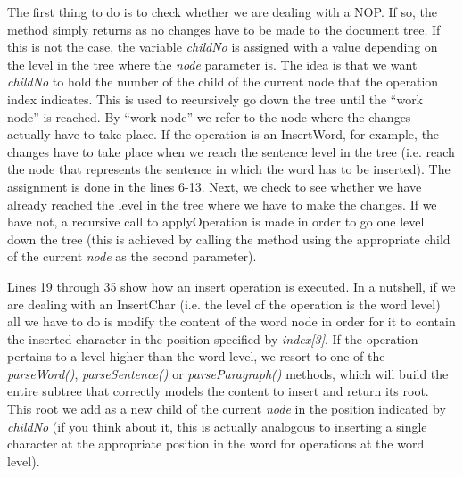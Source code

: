 The first thing to do is to check whether we are dealing with a NOP. If so, the method simply
returns as no changes have to be made to the document tree. If this is not the case, the
variable \emph{childNo} is assigned with a value depending on the level in the tree where the
\emph{node} parameter is. The idea is that we want \emph{childNo} to hold the number
of the child of the current node that the operation index indicates. This is used to
recursively go down the tree until the ``work node'' is reached. By ``work node'' we
refer to the node where the changes actually have to take place. If the operation is
an InsertWord, for example, the changes have to take place when we reach the sentence
level in the tree (i.e. reach the node that represents the sentence in which the word
has to be inserted). The assignment is done in the lines 6-13. Next, we check to see
whether we have already reached the level in the tree where we have to make the changes.
If we have not, a recursive call to applyOperation is made in order to go one level down
the tree (this is achieved by calling the method using the appropriate child of the
current \emph{node} as the second parameter).

Lines 19 through 35 show how an insert operation is executed. In a nutshell, if we are
dealing with an InsertChar (i.e. the level of the operation is the word level) all we
have to do is modify the content of the word node in order for it to contain the
inserted character in the position specified by \emph{index[3]}. If the operation
pertains to a level higher than the word level, we resort to one of the \emph{parseWord()},
\emph{parseSentence()} or \emph{parseParagraph()} methods, which will build the entire
subtree that correctly models the content to insert and return its root. This root
we add as a new child of the current \emph{node} in the position indicated by
\emph{childNo} (if you think about it, this is actually analogous to inserting a
single character at the appropriate position in the word for operations at the word
level).

